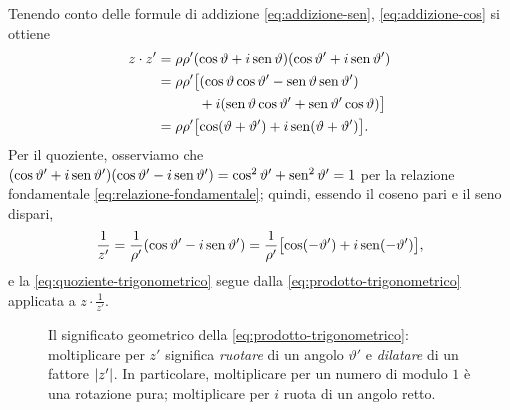 \begin{dimostrazione}
Tenendo conto delle formule di addizione \eqref{eq:addizione-sen},
\eqref{eq:addizione-cos} si ottiene
\begin{equation}\label{eq:prodotto-passo}
\begin{split}
  z\cdot z'&=\rho\rho'(\cos\vartheta+i\operatorname{sen}\vartheta)(\cos\vartheta'+i\operatorname{sen}\vartheta')\\
  &=\rho\rho'\bigl[(\cos\vartheta\cos\vartheta'-\operatorname{sen}\vartheta\operatorname{sen}\vartheta')\\
  &\qquad\quad+i(\operatorname{sen}\vartheta\cos\vartheta'+\operatorname{sen}\vartheta'\cos\vartheta)\bigr]\\
  &=\rho\rho'\bigl[\cos(\vartheta+\vartheta')+i\operatorname{sen}(\vartheta+\vartheta')\bigr].
\end{split}
\end{equation}
Per il quoziente, osserviamo che
$(\cos\vartheta'+i\operatorname{sen}\vartheta')(\cos\vartheta'-i\operatorname{sen}\vartheta')=\cos^{2}\vartheta'+\operatorname{sen}^{2}\vartheta'=1$
per la relazione fondamentale \eqref{eq:relazione-fondamentale}; quindi, essendo il
coseno pari e il seno dispari,
\[
  \frac{1}{z'}=\frac{1}{\rho'}(\cos\vartheta'-i\operatorname{sen}\vartheta')
  =\frac{1}{\rho'}\bigl[\cos(-\vartheta')+i\operatorname{sen}(-\vartheta')\bigr],
\]
e la \eqref{eq:quoziente-trigonometrico} segue dalla \eqref{eq:prodotto-trigonometrico}
applicata a $z\cdot\frac{1}{z'}$.
\end{dimostrazione}

\begin{figure}[htb]
\centering
{}
\caption{Il significato geometrico della \eqref{eq:prodotto-trigonometrico}: moltiplicare
per $z'$ significa \emph{ruotare} di un angolo $\vartheta'$ e \emph{dilatare} di un
fattore $\lvert z'\rvert$. In particolare, moltiplicare per un numero di modulo $1$ è una
rotazione pura; moltiplicare per $i$ ruota di un angolo retto.}
\label{fig:prodotto-rotazione}
\end{figure}

